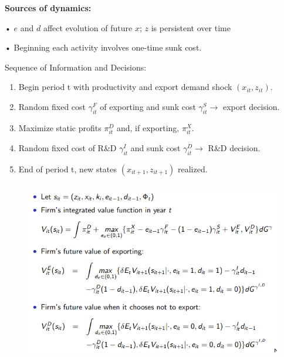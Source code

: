 \documentclass[c, dvipsnames]{beamer}  %
\begin{document}
\begin{frame}[shrink=3]
\frametitle{\insertsection} 

\textbf{Sources of dynamics:}

• $e$ and $d$ affect evolution of future $x$; $z$ is persistent over time

• Beginning each activity involves one-time sunk cost.

Sequence of Information and Decisions:

\begin{enumerate}
	\item  Begin period t with productivity and export demand shock $(x_{it}, z_{it})$.
\item  Random fixed cost $\gamma^F_{it}$ of exporting and sunk cost $γ^S_{it} \to$  export decision.
\item  Maximize static profits $\pi^D_{it}$ and, if exporting, $\pi^X_{it}$.
\item  Random fixed cost of R\&D $\gamma^I_{it}$ and sunk cost $\gamma^D_{it} \to$ R\&D decision.
\item  End of period t, new states $(x_{it+1}, z_{it+1})$ realized.

\end{enumerate}
\end{frame}





\begin{frame}[shrink=3]
\frametitle{\insertsection} 


\begin{figure}
	\centering
	\includegraphics[width=0.7\linewidth]{screenshot004}


	\label{fig:screenshot004}
\end{figure}



\end{frame}
\end{document}
